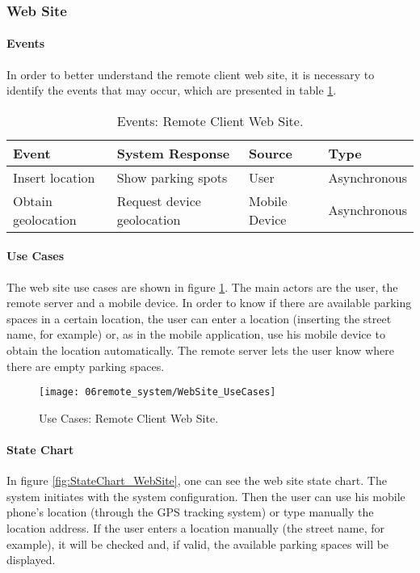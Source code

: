 \subsubsection*{Web Site}
\paragraph*{Events}
In order to better understand the remote client web site, it is necessary to identify the events that may occur, which are presented in table \ref{table:rc_web_events}.

\begin{table}[ht]
	\centering
	\resizebox{\columnwidth}{!}
	{
		\begin{tabular}{|m{3cm}|m{5cm}|m{2.4cm}|m{2.4cm}|}
			\hline
			\textbf{Event} & \textbf{System Response} & \textbf{Source} & \textbf{Type}\\
			\hline\hline
			Insert location	& Show parking spots & User & Asynchronous\\
			\hline
			
			Obtain geolocation & Request device geolocation & Mobile Device & Asynchronous\\
			\hline
			
		\end{tabular}
	}
	\caption{Events: Remote Client Web Site.}
	\label{table:rc_web_events}
\end{table}

\paragraph*{Use Cases}
The web site use cases are shown in figure \ref{fig:UseCases_WebSite}. The main actors are the user, the remote server and a mobile device. In order to know if there are available parking spaces in a certain location, the user can enter a location (inserting the street name, for example) or, as in the mobile application, use his mobile device to obtain the location automatically. The remote server lets the user know where there are empty parking spaces.

\begin{figure}[H]
	\centering
	\texttt{[image: 06remote\_system/WebSite\_UseCases]}
	\caption{Use Cases: Remote Client Web Site.}
	\label{fig:UseCases_WebSite}
\end{figure}

\clearpage
\paragraph*{State Chart}
In figure \ref{fig:StateChart_WebSite}, one can see the web site state chart. The system initiates with the system configuration. Then the user can use his mobile phone's location (through the GPS tracking system) or type manually the location address. If the user enters a location manually (the street name, for example), it will be checked and, if valid, the available parking spaces will be displayed.

